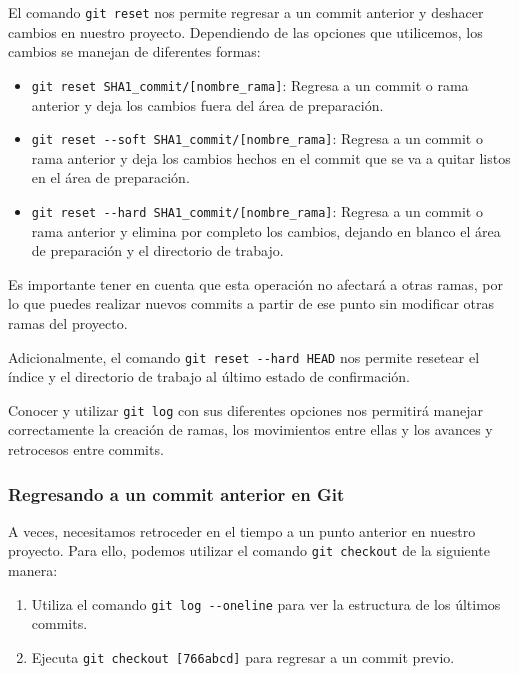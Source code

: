 \documentclass[
  letterpaper,
  DIV=11,
  numbers=noendperiod]{scrartcl}
\providecommand{\tightlist}{%
  \setlength{\itemsep}{0pt}\setlength{\parskip}{0pt}}\usepackage{longtable,booktabs,array}
\begin{document}
El comando \texttt{git\ reset} nos permite regresar a un commit anterior
y deshacer cambios en nuestro proyecto. Dependiendo de las opciones que
utilicemos, los cambios se manejan de diferentes formas:

\begin{itemize}
\item
  \texttt{git\ reset\ SHA1\_commit/{[}nombre\_rama{]}}: Regresa a un
  commit o rama anterior y deja los cambios fuera del área de
  preparación.
\item
  \texttt{git\ reset\ -\/-soft\ SHA1\_commit/{[}nombre\_rama{]}}:
  Regresa a un commit o rama anterior y deja los cambios hechos en el
  commit que se va a quitar listos en el área de preparación.
\item
  \texttt{git\ reset\ -\/-hard\ SHA1\_commit/{[}nombre\_rama{]}}:
  Regresa a un commit o rama anterior y elimina por completo los
  cambios, dejando en blanco el área de preparación y el directorio de
  trabajo.
\end{itemize}

Es importante tener en cuenta que esta operación no afectará a otras
ramas, por lo que puedes realizar nuevos commits a partir de ese punto
sin modificar otras ramas del proyecto.

Adicionalmente, el comando \texttt{git\ reset\ -\/-hard\ HEAD} nos
permite resetear el índice y el directorio de trabajo al último estado
de confirmación.

Conocer y utilizar \texttt{git\ log} con sus diferentes opciones nos
permitirá manejar correctamente la creación de ramas, los movimientos
entre ellas y los avances y retrocesos entre commits.

\hypertarget{regresando-a-un-commit-anterior-en-git}{%
\subsubsection{Regresando a un commit anterior en
Git}\label{regresando-a-un-commit-anterior-en-git}}

A veces, necesitamos retroceder en el tiempo a un punto anterior en
nuestro proyecto. Para ello, podemos utilizar el comando
\texttt{git\ checkout} de la siguiente manera:

\begin{enumerate}
\def\labelenumi{\arabic{enumi}.}
\tightlist
\item
  Utiliza el comando \texttt{git\ log\ -\/-oneline} para ver la
  estructura de los últimos commits.
\item
  Ejecuta \texttt{git\ checkout\ {[}766abcd{]}} para regresar a un
  commit previo.
\end{enumerate}
\end{document}
